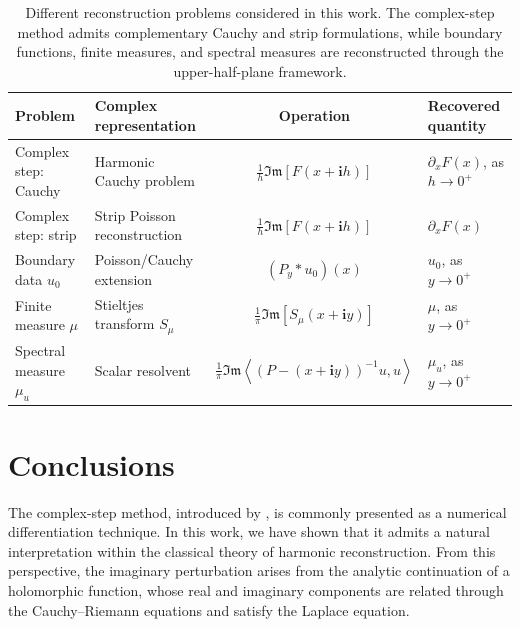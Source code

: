 \documentclass[11pt]{article}
\newcommand{\imag}{\textbf{i}}
\newcommand{\ImagPart}{\mathfrak{Im}}
\begin{document}
   \begin{table}
   	\centering
   	\caption{Different reconstruction problems considered in this work.
   		The complex-step method admits complementary Cauchy and strip
   		formulations, while boundary functions, finite measures, and spectral
   		measures are reconstructed through the upper-half-plane framework.}
   	\label{tab:unifying_reconstruction}
   	\renewcommand{\arraystretch}{2.0}
   	\begin{tabular}{l p{4.5cm} c l}
   		\hline
   		\textbf{Problem}
   		&
   		\textbf{Complex representation}
   		&
   		\textbf{Operation}
   		&
   		\textbf{Recovered quantity}
   		\\
   		\hline
   		
   		Complex step:
   		Cauchy
   		&
   		Harmonic Cauchy problem
   		&
   		\(\displaystyle
   		\frac{1}{h}
   		\ImagPart\!\left[F(x+\imag h)\right]\)
   		&
   		\(\partial_xF(x)\), as \(h\to0^+\)
   		\\
   		
   		Complex step:
   		strip
   		&
   		Strip Poisson reconstruction
   		&
   		\(\displaystyle
   		\frac{1}{h}
   		\ImagPart\!\left[F(x+\imag h)\right]\)
   		&
   		\(\partial_xF(x)\)
   		\\
   		
   		Boundary data \(u_0\)
   		&
   		Poisson/Cauchy extension
   		&
   		\(\displaystyle
   		(P_y*u_0)(x)\)
   		&
   		\(u_0\), as \(y\to0^+\)
   		\\
   		
   		Finite measure \(\mu\)
   		&
   		Stieltjes transform \(S_\mu\)
   		&
   		\(\displaystyle
   		\frac{1}{\pi}
   		\ImagPart\!\left[S_\mu(x+\imag y)\right]\)
   		&
   		\(\mu\), as \(y\to0^+\)
   		\\
   		
   		Spectral measure \(\mu_u\)
   		&
   		Scalar resolvent
   		&
   		\(\displaystyle
   		\frac{1}{\pi}
   		\ImagPart\!
   		\left\langle
   		\left(P-(x+\imag y)\right)^{-1}u,u
   		\right\rangle\)
   		&
   		\(\mu_u\), as \(y\to0^+\)
   		\\
   		\hline
   	\end{tabular}
   \end{table}
    
	\section{Conclusions}
	
    The complex-step method, introduced by \citet{Squire1998}, is commonly
    presented as a numerical differentiation technique. In this work, we
    have shown that it admits a natural interpretation within the classical
    theory of harmonic reconstruction. From this perspective, the imaginary
    perturbation arises from the analytic continuation of a holomorphic
    function, whose real and imaginary components are related through the
    Cauchy--Riemann equations and satisfy the Laplace equation.
    
\end{document}
